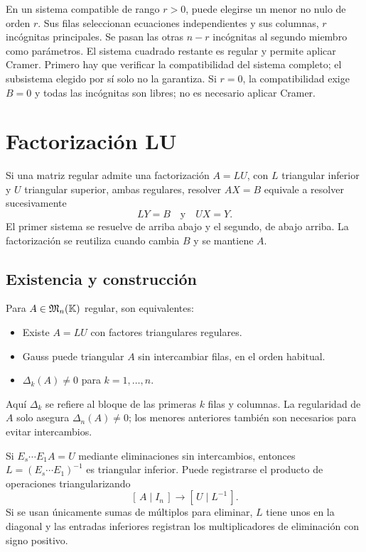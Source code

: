 En un sistema compatible de rango $r>0$, puede elegirse un menor no nulo
de orden $r$. Sus filas seleccionan ecuaciones independientes y sus columnas,
$r$ incógnitas principales. Se pasan las otras $n-r$ incógnitas al segundo
miembro como parámetros. El sistema cuadrado restante es regular y permite
aplicar Cramer. Primero hay que verificar la compatibilidad del sistema
completo; el subsistema elegido por sí solo no la garantiza.
Si $r=0$, la compatibilidad exige $B=0$ y todas las incógnitas son libres;
no es necesario aplicar Cramer.

\section{Factorización LU}
\label{sec:lu}

Si una matriz regular admite una factorización $A=LU$, con $L$ triangular
inferior y $U$ triangular superior, ambas regulares, resolver $AX=B$
equivale a resolver sucesivamente
\[
 LY=B\quad\text{y}\quad UX=Y.
\]
El primer sistema se resuelve de arriba abajo y el segundo, de abajo arriba.
La factorización se reutiliza cuando cambia $B$ y se mantiene $A$.

\begin{samepage}
\subsection*{Existencia y construcción}

Para $A\in\mathfrak{M}_n(\mathbb{K})$ regular, son equivalentes:
\begin{itemize}
 \item Existe $A=LU$ con factores triangulares regulares.
 \item Gauss puede triangular $A$ sin intercambiar filas, en el orden habitual.
 \item $\Delta_k(A)\ne0$ para $k=1,\ldots,n$.
\end{itemize}
\end{samepage}
Aquí $\Delta_k$ se refiere al bloque de las primeras $k$ filas y columnas.
La regularidad de $A$ solo asegura $\Delta_n(A)\ne0$; los menores anteriores
también son necesarios para evitar intercambios.

Si $E_s\cdots E_1A=U$ mediante eliminaciones sin intercambios, entonces
$L=(E_s\cdots E_1)^{-1}$ es triangular inferior. Puede registrarse el
producto de operaciones triangularizando
\[
 [\,A\mid I_n\,]\longrightarrow[\,U\mid L^{-1}\,].
\]
Si se usan únicamente sumas de múltiplos para eliminar, $L$ tiene unos
en la diagonal y las entradas inferiores registran los multiplicadores
de eliminación con signo positivo.

